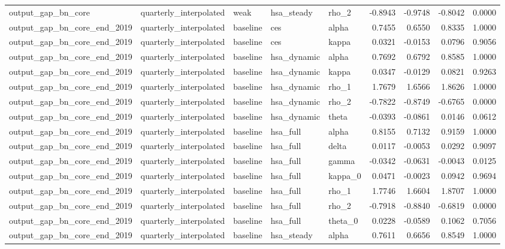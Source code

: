 \begin{tabular}{lllllrrrr}
output\_gap\_bn\_core & quarterly\_interpolated & weak & hsa\_steady & rho\_2 & -0.8943 & -0.9748 & -0.8042 & 0.0000 \\
output\_gap\_bn\_core\_end\_2019 & quarterly\_interpolated & baseline & ces & alpha & 0.7455 & 0.6550 & 0.8335 & 1.0000 \\
output\_gap\_bn\_core\_end\_2019 & quarterly\_interpolated & baseline & ces & kappa & 0.0321 & -0.0153 & 0.0796 & 0.9056 \\
output\_gap\_bn\_core\_end\_2019 & quarterly\_interpolated & baseline & hsa\_dynamic & alpha & 0.7692 & 0.6792 & 0.8585 & 1.0000 \\
output\_gap\_bn\_core\_end\_2019 & quarterly\_interpolated & baseline & hsa\_dynamic & kappa & 0.0347 & -0.0129 & 0.0821 & 0.9263 \\
output\_gap\_bn\_core\_end\_2019 & quarterly\_interpolated & baseline & hsa\_dynamic & rho\_1 & 1.7679 & 1.6566 & 1.8626 & 1.0000 \\
output\_gap\_bn\_core\_end\_2019 & quarterly\_interpolated & baseline & hsa\_dynamic & rho\_2 & -0.7822 & -0.8749 & -0.6765 & 0.0000 \\
output\_gap\_bn\_core\_end\_2019 & quarterly\_interpolated & baseline & hsa\_dynamic & theta & -0.0393 & -0.0861 & 0.0146 & 0.0612 \\
output\_gap\_bn\_core\_end\_2019 & quarterly\_interpolated & baseline & hsa\_full & alpha & 0.8155 & 0.7132 & 0.9159 & 1.0000 \\
output\_gap\_bn\_core\_end\_2019 & quarterly\_interpolated & baseline & hsa\_full & delta & 0.0117 & -0.0053 & 0.0292 & 0.9097 \\
output\_gap\_bn\_core\_end\_2019 & quarterly\_interpolated & baseline & hsa\_full & gamma & -0.0342 & -0.0631 & -0.0043 & 0.0125 \\
output\_gap\_bn\_core\_end\_2019 & quarterly\_interpolated & baseline & hsa\_full & kappa\_0 & 0.0471 & -0.0023 & 0.0942 & 0.9694 \\
output\_gap\_bn\_core\_end\_2019 & quarterly\_interpolated & baseline & hsa\_full & rho\_1 & 1.7746 & 1.6604 & 1.8707 & 1.0000 \\
output\_gap\_bn\_core\_end\_2019 & quarterly\_interpolated & baseline & hsa\_full & rho\_2 & -0.7918 & -0.8840 & -0.6819 & 0.0000 \\
output\_gap\_bn\_core\_end\_2019 & quarterly\_interpolated & baseline & hsa\_full & theta\_0 & 0.0228 & -0.0589 & 0.1062 & 0.7056 \\
output\_gap\_bn\_core\_end\_2019 & quarterly\_interpolated & baseline & hsa\_steady & alpha & 0.7611 & 0.6656 & 0.8549 & 1.0000 \\

\end{tabular}
